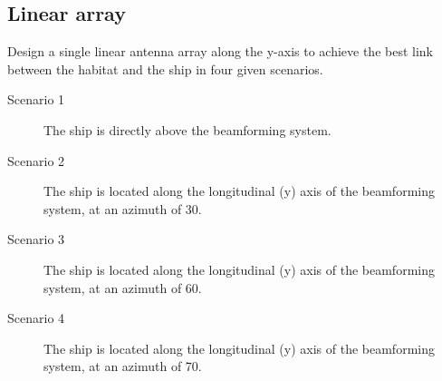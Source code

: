 \documentclass[openany]{book}
\begin{document}
	\subsection{Linear array}
	
	Design a single linear antenna array along the y-axis to achieve the best 
	link 
	between the habitat and the ship in four given scenarios.
	\begin{description}
		\item[Scenario 1] The ship is directly above the beamforming system.
		\item[Scenario 2] The ship is located along the longitudinal (y) axis 
		of 
		the beamforming system, at an azimuth of 30\textdegree.
		\item[Scenario 3] The ship is located along the longitudinal (y) axis 
		of 
		the beamforming system, at an azimuth of 60\textdegree.
		\item[Scenario 4] The ship is located along the longitudinal (y) axis 
		of 
		the beamforming system, at an azimuth of 70\textdegree.
	\end{description}
	
\end{document}
